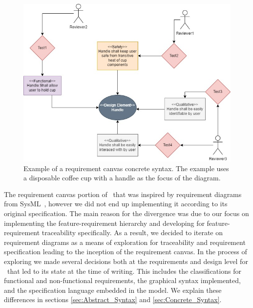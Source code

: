 \begin{figure}[hbt!]
	\centering
	\includegraphics[width=\columnwidth]{Figures/CoffeCup_ReqModel.jpg}
	\caption{Example of a requirement canvas concrete syntax. The example uses a disposable coffee cup with a handle as the focus of the diagram.}
	\label{fig:CoffeCup_ReqModel}
\end{figure}


The requirement canvas portion of \tool\ that was inspired by requirement diagrams from SysML~\cite{sysml2019omg}, however we did not end up implementing it according to its original specification. The main reason for the divergence was due to our focus on implementing the feature-requirement hierarchy and developing for feature-requirement traceability specifically. As a result, we decided to iterate on requirement diagrams as a means of exploration for traceability and requirement specification leading to the inception of the requirement canvas. In the process of exploring we made several decisions both at the requirements and design level for \tool\ that led to its state at the time of writing. This includes the classifications for functional and non-functional requirements, the graphical syntax implemented, and the specification language embedded in the model. We explain these differences in sections \ref{sec:Abstract_Syntax} and \ref{sec:Concrete_Syntax}.

